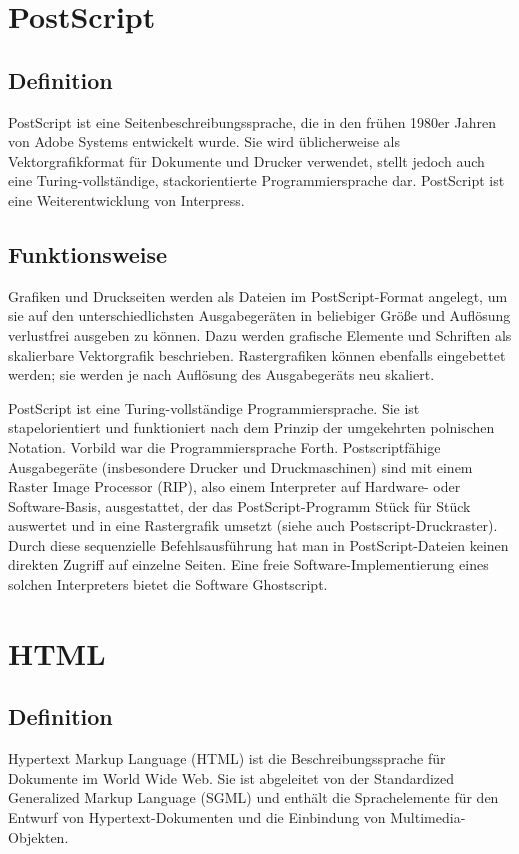 \section{PostScript}
	\subsection{Definition}
		PostScript ist eine Seitenbeschreibungssprache, die in den frühen 1980er Jahren von Adobe Systems entwickelt wurde. Sie wird üblicherweise als Vektorgrafikformat für Dokumente und Drucker verwendet, stellt jedoch auch eine Turing-vollständige, stackorientierte Programmiersprache dar. PostScript ist eine Weiterentwicklung von Interpress.
		
	\subsection{Funktionsweise}
		Grafiken und Druckseiten werden als Dateien im PostScript-Format angelegt, um sie auf den unterschiedlichsten Ausgabegeräten in beliebiger Größe und Auflösung verlustfrei ausgeben zu können. Dazu werden grafische Elemente und Schriften als skalierbare Vektorgrafik beschrieben. Rastergrafiken können ebenfalls eingebettet werden; sie werden je nach Auflösung des Ausgabegeräts neu skaliert.
		
		PostScript ist eine Turing-vollständige Programmiersprache. Sie ist stapelorientiert und funktioniert nach dem Prinzip der umgekehrten polnischen Notation. Vorbild war die Programmiersprache Forth. Postscriptfähige Ausgabegeräte (insbesondere Drucker und Druckmaschinen) sind mit einem Raster Image Processor (RIP), also einem Interpreter auf Hardware- oder Software-Basis, ausgestattet, der das PostScript-Programm Stück für Stück auswertet und in eine Rastergrafik umsetzt (siehe auch Postscript-Druckraster). Durch diese sequenzielle Befehlsausführung hat man in PostScript-Dateien keinen direkten Zugriff auf einzelne Seiten. Eine freie Software-Implementierung eines solchen Interpreters bietet die Software Ghostscript.
\section{HTML}
	\subsection{Definition}
		Hypertext Markup Language (HTML) ist die Beschreibungssprache für Dokumente im World Wide Web. Sie ist abgeleitet von der Standardized Generalized Markup Language (SGML) und enthält die Sprachelemente für den Entwurf von Hypertext-Dokumenten und die Einbindung von Multimedia-Objekten.

